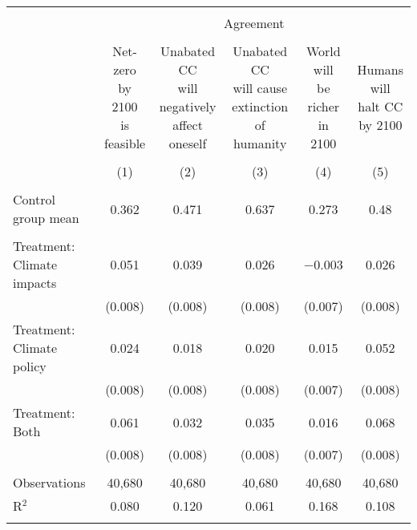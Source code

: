 
\begin{tabular}{@{\extracolsep{5pt}}lccccc} 
\\[-1.8ex]\hline 
\hline \\[-1.8ex] 
 & \multicolumn{5}{c}{Agreement} \\ 
\cline{2-6} 
\\[-1.8ex] & \makecell{Net-zero\\by 2100\\is feasible} & \makecell{Unabated CC\\will negatively\\affect oneself} & \makecell{Unabated CC\\will cause\\extinction of humanity} & \makecell{World will\\be richer\\in 2100} & \makecell{Humans will\\halt CC\\by 2100} \\ 
\\[-1.8ex] & (1) & (2) & (3) & (4) & (5)\\ 
\hline \\[-1.8ex] 
Control group mean & 0.362 & 0.471 & 0.637 & 0.273 & 0.48  \\ \hline \\[-1.8ex]
 Treatment: Climate impacts & 0.051 & 0.039 & 0.026 & $-$0.003 & 0.026 \\ 
  & (0.008) & (0.008) & (0.008) & (0.007) & (0.008) \\ 
  Treatment: Climate policy & 0.024 & 0.018 & 0.020 & 0.015 & 0.052 \\ 
  & (0.008) & (0.008) & (0.008) & (0.007) & (0.008) \\ 
  Treatment: Both & 0.061 & 0.032 & 0.035 & 0.016 & 0.068 \\ 
  & (0.008) & (0.008) & (0.008) & (0.007) & (0.008) \\ 
 \hline \\[-1.8ex] 

Observations & 40,680 & 40,680 & 40,680 & 40,680 & 40,680 \\ 
R$^{2}$ & 0.080 & 0.120 & 0.061 & 0.168 & 0.108 \\ 
\hline 
\hline \\[-1.8ex] 
\end{tabular} 
